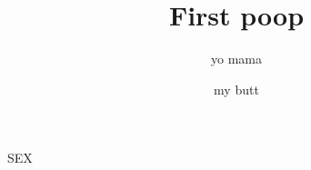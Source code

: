 \documentclass[12pt, letterpaper, twoside]{article}
\title{First poop}
\author{yo mama}
\date{my butt}
\begin{document}
\begin{titlepage}
\maketitle
\end{titlepage}

SEX
\end{document}
